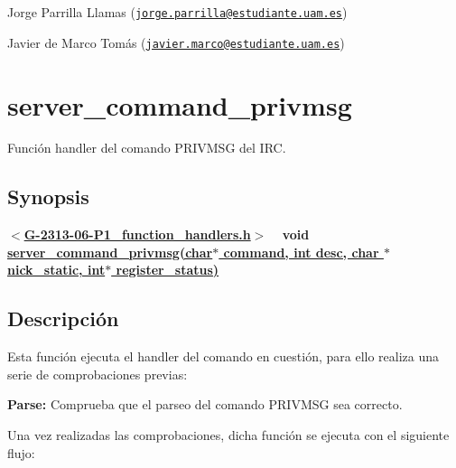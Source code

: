 \begin{DoxyItemize}
\item Jorge Parrilla Llamas (\href{mailto:jorge.parrilla@estudiante.uam.es}{\tt jorge.\+parrilla@estudiante.\+uam.\+es}) 
\item Javier de Marco Tomás (\href{mailto:javier.marco@estudiante.uam.es}{\tt javier.\+marco@estudiante.\+uam.\+es}) 
\end{DoxyItemize}\hypertarget{server_command_privmsg}{}\section{server\+\_\+command\+\_\+privmsg}\label{server_command_privmsg}
Función handler del comando P\+R\+I\+V\+M\+S\+G del I\+R\+C.\hypertarget{server_command_privmsg_synopsis_privmsg}{}\subsection{Synopsis}\label{server_command_privmsg_synopsis_privmsg}
{ {\bfseries $<$\hyperlink{G-2313-06-P1__function__handlers_8h}{G-\/2313-\/06-\/\+P1\+\_\+function\+\_\+handlers.\+h}$>$} ~\newline
 {\bfseries void \hyperlink{G-2313-06-P1__function__handlers_8c_a8daf68135f2d9e9412c04a2980bdfb2f}{server\+\_\+command\+\_\+privmsg(char$\ast$ command, int desc, char $\ast$ nick\+\_\+static, int$\ast$ register\+\_\+status)}} } \hypertarget{server_command_privmsg_descripcion_privmsg}{}\subsection{Descripción}\label{server_command_privmsg_descripcion_privmsg}
Esta función ejecuta el handler del comando en cuestión, para ello realiza una serie de comprobaciones previas\+:


\begin{DoxyItemize}
\item {\bfseries Parse\+:} Comprueba que el parseo del comando P\+R\+I\+V\+M\+S\+G sea correcto. 
\end{DoxyItemize}

Una vez realizadas las comprobaciones, dicha función se ejecuta con el siguiente flujo\+:


